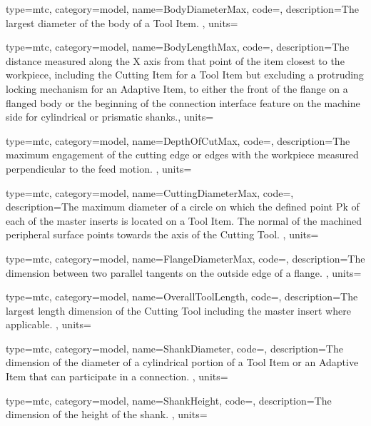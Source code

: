 {
  type=mtc,
  category=model,
  name={BodyDiameterMax},
  code=,
  description={The largest diameter of the body of a Tool Item. },
  units=
}


{
  type=mtc,
  category=model,
  name={BodyLengthMax},
  code=,
  description={The distance measured along the X axis from that point of the item closest to the workpiece, including the Cutting Item for a Tool Item but excluding a protruding locking mechanism for an Adaptive Item, to either the front of the flange on a flanged body or the beginning of the connection interface feature on the machine side for cylindrical or prismatic shanks.},
  units=
}


{
  type=mtc,
  category=model,
  name={DepthOfCutMax},
  code=,
  description={The maximum engagement of the cutting edge or edges with the workpiece measured perpendicular to the feed motion. },
  units=
}


{
  type=mtc,
  category=model,
  name={CuttingDiameterMax},
  code=,
  description={The maximum diameter of a circle on which the defined point Pk of each of the master inserts is located on a Tool Item. The normal of the machined peripheral surface points towards the axis of the Cutting Tool. },
  units=
}


{
  type=mtc,
  category=model,
  name={FlangeDiameterMax},
  code=,
  description={The dimension between two parallel tangents on the outside edge of a flange. },
  units=
}


{
  type=mtc,
  category=model,
  name={OverallToolLength},
  code=,
  description={The largest length dimension of the Cutting Tool including the master insert where applicable.  },
  units=
}


{
  type=mtc,
  category=model,
  name={ShankDiameter},
  code=,
  description={The dimension of the diameter of a cylindrical portion of a Tool Item or an Adaptive Item that can participate in a connection. },
  units=
}


{
  type=mtc,
  category=model,
  name={ShankHeight},
  code=,
  description={The dimension of the height of the shank. },
  units=
}


